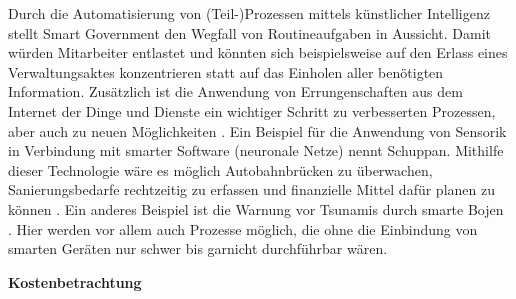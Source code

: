 Durch die Automatisierung von (Teil-)Prozessen mittels künstlicher Intelligenz stellt Smart Government den Wegfall von Routineaufgaben in Aussicht.
Damit würden Mitarbeiter entlastet und könnten sich beispielsweise auf den Erlass eines Verwaltungsaktes konzentrieren statt auf das Einholen aller benötigten Information.
Zusätzlich ist die Anwendung von Errungenschaften aus dem Internet der Dinge und Dienste ein wichtiger Schritt zu verbesserten Prozessen, aber auch zu neuen Möglichkeiten \citep[][]{Lucke2016}.  
Ein Beispiel für die Anwendung von Sensorik in Verbindung mit smarter Software (neuronale Netze) nennt Schuppan.
Mithilfe dieser Technologie wäre es möglich Autobahnbrücken zu überwachen, Sanierungsbedarfe rechtzeitig zu erfassen und finanzielle Mittel dafür planen zu können \citep[][]{Schuppan2016}.
Ein anderes Beispiel ist die Warnung vor Tsunamis durch smarte Bojen \citep[][]{Lucke2016}.
Hier werden vor allem auch Prozesse möglich, die ohne die Einbindung von smarten Geräten nur schwer bis garnicht durchführbar wären.

\textbf{Kostenbetrachtung}\\


